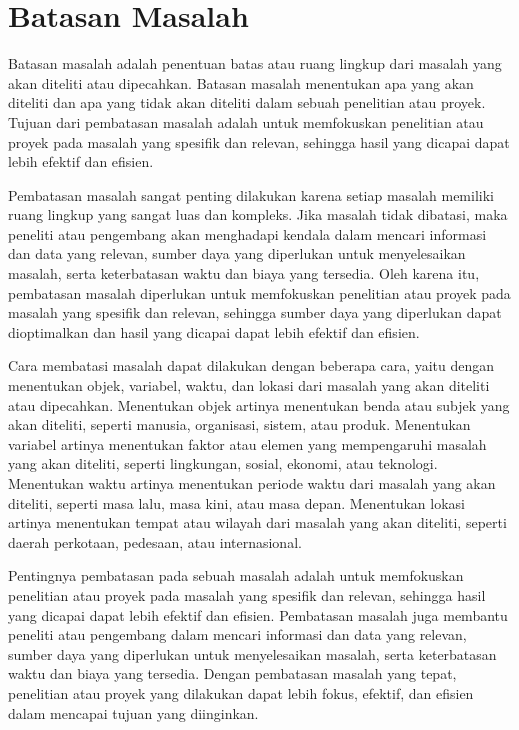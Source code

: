 \section{Batasan Masalah}
Batasan masalah adalah penentuan batas atau ruang lingkup dari masalah yang akan diteliti atau dipecahkan. Batasan masalah menentukan apa yang akan diteliti dan apa yang tidak akan diteliti dalam sebuah penelitian atau proyek. Tujuan dari pembatasan masalah adalah untuk memfokuskan penelitian atau proyek pada masalah yang spesifik dan relevan, sehingga hasil yang dicapai dapat lebih efektif dan efisien.

Pembatasan masalah sangat penting dilakukan karena setiap masalah memiliki ruang lingkup yang sangat luas dan kompleks. Jika masalah tidak dibatasi, maka peneliti atau pengembang akan menghadapi kendala dalam mencari informasi dan data yang relevan, sumber daya yang diperlukan untuk menyelesaikan masalah, serta keterbatasan waktu dan biaya yang tersedia. Oleh karena itu, pembatasan masalah diperlukan untuk memfokuskan penelitian atau proyek pada masalah yang spesifik dan relevan, sehingga sumber daya yang diperlukan dapat dioptimalkan dan hasil yang dicapai dapat lebih efektif dan efisien.

Cara membatasi masalah dapat dilakukan dengan beberapa cara, yaitu dengan menentukan objek, variabel, waktu, dan lokasi dari masalah yang akan diteliti atau dipecahkan. Menentukan objek artinya menentukan benda atau subjek yang akan diteliti, seperti manusia, organisasi, sistem, atau produk. Menentukan variabel artinya menentukan faktor atau elemen yang mempengaruhi masalah yang akan diteliti, seperti lingkungan, sosial, ekonomi, atau teknologi. Menentukan waktu artinya menentukan periode waktu dari masalah yang akan diteliti, seperti masa lalu, masa kini, atau masa depan. Menentukan lokasi artinya menentukan tempat atau wilayah dari masalah yang akan diteliti, seperti daerah perkotaan, pedesaan, atau internasional.

Pentingnya pembatasan pada sebuah masalah adalah untuk memfokuskan penelitian atau proyek pada masalah yang spesifik dan relevan, sehingga hasil yang dicapai dapat lebih efektif dan efisien. Pembatasan masalah juga membantu peneliti atau pengembang dalam mencari informasi dan data yang relevan, sumber daya yang diperlukan untuk menyelesaikan masalah, serta keterbatasan waktu dan biaya yang tersedia. Dengan pembatasan masalah yang tepat, penelitian atau proyek yang dilakukan dapat lebih fokus, efektif, dan efisien dalam mencapai tujuan yang diinginkan.

